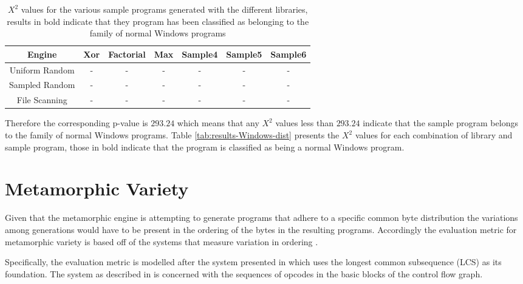 \documentclass[finalcopy,short]{srpaper}
\begin{document}
        \begin{table}
            \centering
            \begin{tabular}{|c||c|c|c|c|c|c|}
                \hline
                Engine & Xor & Factorial & Max & Sample4 & Sample5 & Sample6 \\
                \hline
                Uniform Random & - & - & - & - & - & - \\
                \hline
                Sampled Random & - & - & - & - & - & - \\
                \hline
                File Scanning & - & - & - & - & - & - \\
                \hline
            \end{tabular}
            \caption{$X^2$ values for the various sample programs generated with
            the different libraries, results in bold indicate that they program
            has been classified as belonging to the family of normal Windows
            programs}
            \label{tab:results-Windows-like}
        \end{table}

        Therefore the corresponding p-value is $293.24$ which means that any
        $X^2$ values less than $293.24$ indicate that the sample program belongs
        to the family of normal Windows programs. Table \ref{tab:results-Windows-dist}
        presents the $X^2$ values for each combination of library and sample
        program, those in bold indicate that the program is classified as being
        a normal Windows program.


    \section{Metamorphic Variety}
        
        Given that the metamorphic engine is attempting to generate programs
        that adhere to a specific common byte distribution the variations among
        generations would have to be present in the ordering of the bytes in the
        resulting programs. Accordingly the evaluation metric for metamorphic
        variety is based off of the systems that measure variation in ordering
        \cite{cfg_lcs,towards_lcs}.

        Specifically, the evaluation metric is modelled after the system
        presented in \cite{cfg_lcs} which uses the longest common subsequence
        (LCS) as its foundation. The system as described in \cite{cfg_lcs}
        is concerned with the sequences of opcodes in the basic blocks of the
        control flow graph.
        
\end{document}
